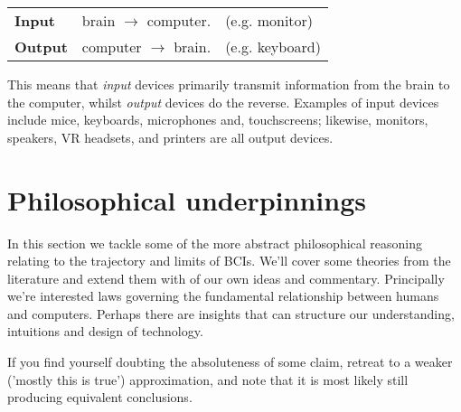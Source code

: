\documentclass[logo,bsc,singlespacing,parskip]{infthesis}
\begin{document}
\begin{tabular}{lll}
\textbf{Input} \label{input} & brain \(\rightarrow\) computer. & (e.g. monitor)\\
\textbf{Output} \label{output} & computer \(\rightarrow\) brain. & (e.g. keyboard)\\
\end{tabular}

\medskip
\noindent This means that \emph{input} devices primarily transmit information from the brain to the computer, whilst \emph{output} devices do the reverse.
Examples of input devices include mice, keyboards, microphones and, touchscreens; likewise, monitors, speakers, VR headsets, and printers are all output devices.

\section{Philosophical underpinnings}
\label{sec:orga3eb3b1}
In this section we tackle some of the more abstract philosophical reasoning relating to the trajectory and limits of BCIs.
We'll cover some theories from the literature and extend them with of our own ideas and commentary.
Principally we're interested laws governing the fundamental relationship between humans and computers.
Perhaps there are insights that can structure our understanding, intuitions and design of technology.

If you find yourself doubting the absoluteness of some claim, retreat to a weaker ('mostly this is true') approximation, and note that it is most likely still producing equivalent conclusions.
\end{document}
